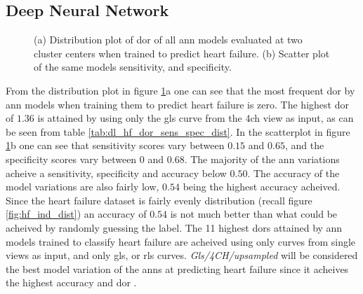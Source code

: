 \clearpage

\subsection{Deep Neural Network}

\begin{figure}[H]
    \centering
    
    \caption{(a) Distribution plot of \acrshort{dor} of all \acrshort{ann} models evaluated at two cluster centers when trained to predict heart failure.
             (b) Scatter plot of the same models sensitivity, and specificity.}
    \label{fig:dl_hf_dor_sens_spec_dist}
\end{figure}

From the distribution plot in figure \ref{fig:dl_hf_dor_sens_spec_dist}a one can see that the most frequent \acrshort{dor} by \acrshort{ann} models when training them to predict heart failure is zero. The highest \acrshort{dor} of $1.36$ is attained by using only the \acrshort{gls} curve from the \acrshort{4ch} view as input, as can be seen from table \ref{tab:dl_hf_dor_sens_spec_dist}. In the scatterplot in figure \ref{fig:dl_hf_dor_sens_spec_dist}b one can see that sensitivity scores vary between $0.15$ and $0.65$, and the specificity scores vary between $0$ and $0.68$. The majority of the \acrshort{ann} variations acheive a sensitivity, specificity and accuracy below $0.50$. The accuracy of the model variations are also fairly low, $0.54$ being the highest accuracy acheived. Since the heart failure dataset is fairly evenly distribution (recall figure \ref{fig:hf_ind_dist}) an accuracy of $0.54$ is not much better than what could be acheived by randomly guessing the label. The 11 highest \acrshort{dor}s attained by \acrshort{ann} models trained to classify heart failure are acheived using only curves from single views as input, and only \acrshort{gls}, or \acrshort{rls} curves. \textit{Gls/4CH/upsampled} will be considered the best model variation of the \acrshort{ann}s at predicting heart failure since it acheives the highest accuracy and \acrshort{dor} . \bigskip

